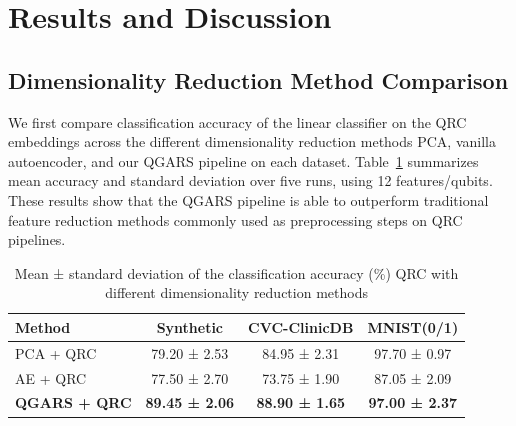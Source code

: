 \documentclass[conference]{IEEEtran}
\begin{document}
\section{Results and Discussion} \label{results_and_discussion}

\subsection{Dimensionality Reduction Method Comparison}
We first compare classification accuracy of the linear classifier on the QRC embeddings across the different dimensionality reduction methods PCA, vanilla autoencoder, and our QGARS pipeline on each dataset. Table~\ref{tab:qrc_reduction_accuracy} summarizes mean accuracy and standard deviation over five runs, using 12 features/qubits. These results show that the QGARS pipeline is able to outperform traditional feature reduction methods commonly used as preprocessing steps on QRC pipelines.

\begin{table}[!b]
  \caption{Mean ± standard deviation of the classification accuracy (\%) QRC with different dimensionality reduction methods}
  \centering
  \label{tab:qrc_reduction_accuracy}
  \begin{tabular}{lccc}
    \hline
    Method         & Synthetic  & CVC-ClinicDB & MNIST(0/1) \\
    \hline
    PCA + QRC      &  79.20 ± 2.53  &  84.95 ± 2.31   &  97.70 ± 0.97 \\
    AE + QRC       &  77.50 ± 2.70  & 73.75 ± 1.90   &  87.05 ± 2.09 \\
    \textbf{QGARS + QRC}    &  \textbf{89.45 ± 2.06} &  \textbf{88.90 ± 1.65} &  \textbf{97.00 ± 2.37} \\
    \hline
  \end{tabular}
\end{table}
\end{document}
